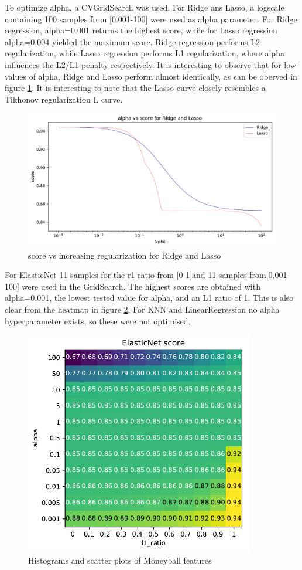 To optimize alpha, a CVGridSearch was used. For Ridge ans Lasso, a logscale containing 100 samples from [0.001-100] were used as alpha parameter. For Ridge regression, alpha=0.001 returns the highest score, while for Lasso regression alpha=0.004 yielded the maximum score. Ridge regression performs L2 regularization, while Lasso regression performs L1 regularization, where alpha influences the L2/L1 penalty respectively. It is interesting to observe that for low values of alpha, Ridge and Lasso perform almost identically, as can be oberved in figure \ref{fig:ridgelasso}. It is interesting to note that the Lasso curve closely resembles a Tikhonov regularization L curve. \\

\begin{figure}
\centering    
\includegraphics[width=120mm]{./Figures_1/ridgelasso}
\caption{score vs increasing regularization for Ridge and Lasso}
\label{fig:ridgelasso} %
\end{figure}

For ElasticNet 11 samples for the r1 ratio from [0-1]and 11 samples from[0.001-100] were used in the GridSearch. The highest scores are obtained with alpha=0.001, the lowest tested value for alpha, and an L1 ratio of 1. This is also clear from the heatmap in figure \ref{fig:elasticnet}. 
For KNN and LinearRegression no alpha hyperparameter exists, so these were not optimised.

\begin{figure}
\centering    
\includegraphics[width=100mm]{./Figures_1/elasticnet}
\caption{Histograms and scatter plots of Moneyball features}
\label{fig:elasticnet} %
\end{figure}

